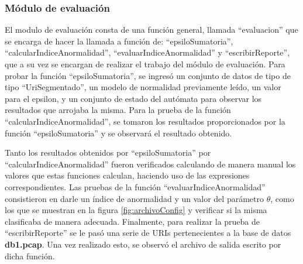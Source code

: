 \subsubsection{Módulo de evaluación}

El modulo de evaluación consta de una función general, llamada ``evaluacion'' que se encarga de hacer la llamada a función de: ``epsiloSumatoria'',
``calcularIndiceAnormalidad'', ``evaluarIndiceAnormalidad'' y ``escribirReporte'', que a su vez se encargan de realizar el trabajo del módulo de evaluación.
Para probar la función ``epsiloSumatoria'', se ingresó un conjunto de datos de tipo de tipo ``UriSegmentado'', un modelo de normalidad previamente leído, un valor para el epsilon, y un conjunto de estado del autómata para observar los resultados que arrojaba la misma.
Para la prueba de la función ``calcularIndiceAnormalidad'', se tomaron
los resultados proporcionados por la función ``epsiloSumatoria'' y se observará el resultado obtenido.

Tanto los resultados obtenidos por ``epsiloSumatoria'' por ``calcularIndiceAnormalidad'' fueron verificados calculando de manera manual los valores
que estas funciones calculan, haciendo uso de las expresiones correspondientes.
Las pruebas de la función ``evaluarIndiceAnormalidad'' consistieron en
darle un  índice de anormalidad y un valor del parámetro $\theta$, como los que
se muestran en la figura \ref{fig:archivoConfig} y verificar si la misma clasificaba de manera adecuada.
Finalmente, para realizar la prueba de ``escribirReporte'' se le pasó una serie de URIs pertenecientes a la base de datos \textbf{db1.pcap}. Una vez realizado
esto, se observó el archivo de salida escrito por dicha función.
